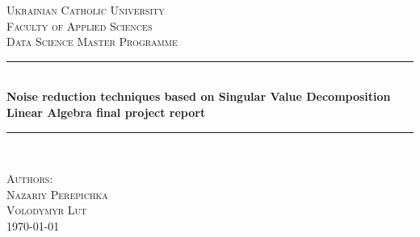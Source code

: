 \begin{titlepage}

\newcommand{\HRule}{\rule{\linewidth}{0.5mm}} %

\center %
 

\textsc{\LARGE Ukrainian Catholic University}\\[1cm] %
\textsc{\Large  Faculty of Applied Sciences}\\[0.5cm] %
\textsc{\large Data Science Master Programme}\\[0.5cm] %

\vspace*{1cm}

\HRule \\[0.4cm]
{ \huge \bfseries Noise reduction techniques based on Singular Value Decomposition}\\[10pt]
{\Large \bfseries Linear Algebra final project report}\\[0.4cm] %
\HRule \\[1cm]
 
\vspace*{1cm}

\Large \textsc{Authors:}\\
\textsc{Nazariy Perepichka}\\ \textsc{Volodymyr Lut}\\[1cm] %

\vspace*{1cm}
{\large \today}\\[2cm] %


\end{titlepage}
